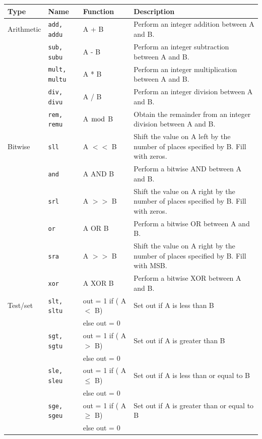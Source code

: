 \documentclass[a4paper,10pt]{article}
\begin{document}
\begin{table}[h]
\begin{center}
\begin{tabular}{|l|l|l|p{75mm}|}
\hline
\textbf{Type} & \textbf{Name} & \textbf{Function} 
& \textbf{Description} \\
\hline
Arithmetic & \texttt{add, addu} & A + B & Perform an integer
addition between A and B. \\
\cline{2-4}
& \texttt{sub, subu} & A - B & Perform an integer
subtraction between A and B. \\
\cline{2-4}
& \texttt{mult, multu} & A * B & Perform an
integer multiplication between A and B. \\
\cline{2-4}
& \texttt{div, divu} & A / B & Perform an integer
division between A and B. \\
\cline{2-4} 
& \texttt{rem, remu} & A $\bmod$ B & Obtain the remainder from an
integer division between A and B. \\
\hline
Bitwise & \texttt{sll} & A $<<$ B & Shift the value on A left by the number of
places specified by B. Fill with zeros. \\
\cline{2-4}
& \texttt{and} & A AND B & Perform a bitwise AND between A and B. \\
\cline{2-4}
& \texttt{srl} & A $>>$ B & Shift the value on A right by the number of places
specified by B. Fill with zeros. \\
\cline{2-4}
& \texttt{or} & A OR B & Perform a bitwise OR between A and B.\\
\cline{2-4}
& \texttt{sra} & A $>>$ B & Shift the value on A right by the number of places
specified by B. Fill with MSB.\\
\cline{2-4}
& \texttt{xor} & A XOR B & Perform a bitwise XOR between A and B. \\
\hline
Test/set & \texttt{slt, sltu} & out = 1 if ( A $<$ B) & Set out if A
is less than B\\
& & else out = 0 & \\
\cline{2-4}
& \texttt{sgt, sgtu} & out = 1 if ( A $>$ B) & Set out if A
is greater than B \\
& & else out = 0 & \\
\cline{2-4}
& \texttt{sle, sleu} & out = 1 if ( A $\le$ B) & Set out if A
is less than or equal to B\\
& & else out = 0 & \\
\cline{2-4}
& \texttt{sge, sgeu} & out = 1 if ( A $\ge$ B) & Set out if A
is greater than or equal to B\\
& & else out = 0 & \\

\end{tabular}
\end{center}
\end{table}
\end{document}
